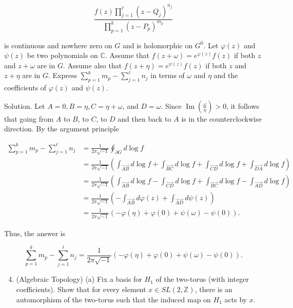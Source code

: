 \documentclass[10pt]{article}
\begin{document}
$$
\frac{f(z) \prod_{j=1}^{\ell}\left(z-Q_{j}\right)^{n_{j}}}{\prod_{p=1}^{k}\left(z-P_{p}\right)^{m_{p}}}
$$

is continuous and nowhere zero on $G$ and is holomorphic on $G^{0}$. Let $\varphi(z)$ and $\psi(z)$ be two polynomials on $\mathbb{C}$. Assume that $f(z+\omega)=e^{\varphi(z)} f(z)$ if both $z$ and $z+\omega$ are in $G$. Assume also that $f(z+\eta)=e^{\psi(z)} f(z)$ if both $z$ and $z+\eta$ are in $G$. Express $\sum_{p=1}^{k} m_{p}-\sum_{j=1}^{\ell} n_{j}$ in terms of $\omega$ and $\eta$ and the coefficients of $\varphi(z)$ and $\psi(z)$.

Solution. Let $A=0, B=\eta, C=\eta+\omega$, and $D=\omega$. Since $\operatorname{Im}\left(\frac{\omega}{\eta}\right)>0$, it follows that going from $A$ to $B$, to $C$, to $D$ and then back to $A$ is in the counterclockwise direction. By the argument principle

$$
\begin{aligned}
\sum_{p=1}^{k} m_{p}-\sum_{j=1}^{\ell} n_{j} & =\frac{1}{2 \pi \sqrt{-1}} \oint_{\partial G} d \log f \\
& =\frac{1}{2 \pi \sqrt{-1}}\left(\int_{\overrightarrow{A B}} d \log f+\int_{\overrightarrow{B C}} d \log f+\int_{\overrightarrow{C D}} d \log f+\int_{\overrightarrow{D A}} d \log f\right) \\
& =\frac{1}{2 \pi \sqrt{-1}}\left(\int_{\overrightarrow{A B}} d \log f-\int_{\overrightarrow{C D}} d \log f+\int_{\overrightarrow{B C}} d \log f-\int_{\overrightarrow{A D}} d \log f\right) \\
& =\frac{1}{2 \pi \sqrt{-1}}\left(-\int_{\overrightarrow{A B}} d \varphi(z)+\int_{\overrightarrow{A D}} d \psi(z)\right) \\
& =\frac{1}{2 \pi \sqrt{-1}}(-\varphi(\eta)+\varphi(0)+\psi(\omega)-\psi(0)) .
\end{aligned}
$$

Thus, the answer is

$$
\sum_{p=1}^{k} m_{p}-\sum_{j=1}^{\ell} n_{j}=\frac{1}{2 \pi \sqrt{-1}}(-\varphi(\eta)+\varphi(0)+\psi(\omega)-\psi(0)) .
$$

\begin{enumerate}
  \setcounter{enumi}{3}
  \item (Algebraic Topology) (a) Fix a basis for $H_{1}$ of the two-torus (with integer coefficients). Show that for every element $x \in S L(2, \mathbb{Z})$, there is an automorphism of the two-torus such that the induced map on $H_{1}$ acts by $x$.
\end{enumerate}
\end{document}
